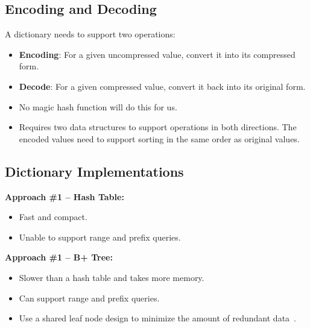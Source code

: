 \documentclass[11pt]{article}
\begin{document}
\subsection{Encoding and Decoding}
A dictionary needs to support two operations:
\begin{itemize}
    \item \textbf{Encoding}:
    For a given uncompressed value, convert it into its compressed form.
    
    \item \textbf{Decode}:
    For a given compressed value, convert it back into its original form.
    
    \item
    No magic hash function will do this for us.
    
    \item
    Requires two data structures to support operations in both directions.
    The encoded values need to support sorting in the same order as original values.
\end{itemize}

\subsection{Dictionary Implementations}

\textbf{Approach \#1 -- Hash Table:}
\begin{itemize}
    \item
    Fast and compact.
    
    \item
    Unable to support range and prefix queries.
\end{itemize}

\textbf{Approach \#1 -- B+ Tree:}
\begin{itemize}
    \item
    Slower than a hash table and takes more memory.
    \item
    Can support range and prefix queries.
    
    \item
    Use a shared leaf node design to minimize the amount of redundant data~\cite{p283-binnig}.
\end{itemize}


\newpage


\end{document}
